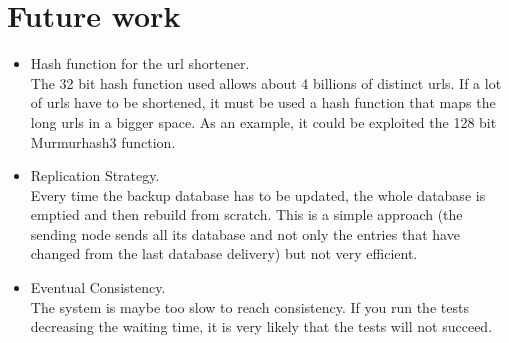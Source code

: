 \documentclass{article}
\begin{document}
\section{Future work} 
\begin{itemize}
\item Hash function for the url shortener. \\
The 32 bit hash function used allows about 4 billions of distinct urls. If a lot of urls have to be shortened, it must be used a hash function that maps the long urls in a bigger space. As an example, it could be exploited the 128 bit Murmurhash3 function.
\item Replication Strategy. \\
Every time the backup database has to be updated, the whole database is emptied and then rebuild from scratch. This is a simple approach (the sending node sends all its database and not only the entries that have changed from the last database delivery) but not very efficient.
\item Eventual Consistency. \\
The system is maybe too slow to reach consistency. If you run the tests decreasing the waiting time, it is very likely that the tests will not succeed.
\end{itemize}
\end{document}
